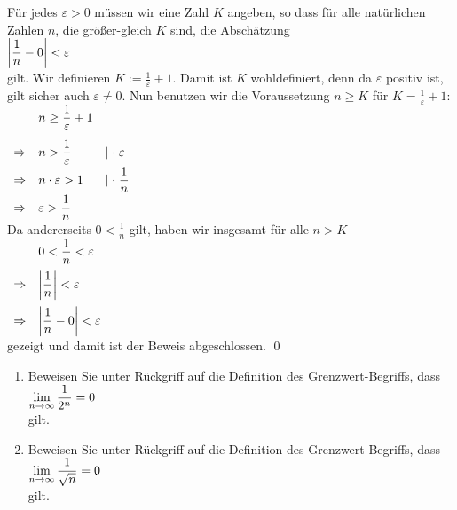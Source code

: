 \proof
F\"ur jedes  $\varepsilon > 0$ m\"ussen wir eine Zahl $K$ angeben, so
dass f\"ur alle nat\"urlichen Zahlen $n$, die gr\"o\ss{}er-gleich $K$ sind, die Absch\"atzung
\\[0.2cm]
\hspace*{1.3cm}
$\displaystyle \left| \frac{1}{n} - 0 \right| < \varepsilon $
\\[0.2cm]
gilt.  Wir definieren $K := \frac{1}{\varepsilon} + 1$.  Damit ist $K$ wohldefiniert,
denn da $\varepsilon$ positiv ist, gilt sicher auch $\varepsilon \not= 0$.  Nun benutzen
wir die Voraussetzung $n \geq K$ f\"ur $K = \frac{1}{\varepsilon} + 1$:
\\[0.2cm]
\hspace*{1.3cm}
$
\begin{array}{cll}
            & \displaystyle n \geq \frac{1}{\varepsilon} + 1      \\[0.4cm] 
\Rightarrow & \displaystyle n > \frac{1}{\varepsilon} & \mid \cdot \;\varepsilon \\[0.2cm]
\Rightarrow & n \cdot \varepsilon > 1        & \displaystyle\mid \cdot \;\frac{1}{n} \\[0.2cm]
\Rightarrow & \displaystyle \varepsilon > \frac{1}{n} & 
\end{array}
$
\\[0.2cm]
Da andererseits  $0 < \frac{1}{n}$ gilt, haben wir insgesamt f\"ur alle $n > K$
\\[0.2cm]
\hspace*{1.3cm}
$
\begin{array}{cl}
            & \displaystyle 0 < \frac{1}{n} < \varepsilon              \\[0.3cm]
\Rightarrow & \displaystyle \left|\frac{1}{n}\right| < \varepsilon     \\[0.4cm]
\Rightarrow & \displaystyle \left|\frac{1}{n}-0\right| < \varepsilon
\end{array}
$
\\[0.2cm]
gezeigt und damit ist der Beweis abgeschlossen. \qed

\exercise
\renewcommand{\labelenumi}{(\alph{enumi})}
\begin{enumerate}
\item Beweisen Sie unter R\"uckgriff auf die Definition des Grenzwert-Begriffs, dass
\\[0.2cm]
\hspace*{1.3cm}
$\displaystyle\lim\limits_{n\rightarrow\infty} \frac{1}{2^n} = 0$ 
\\[0.2cm] gilt.
\item Beweisen Sie unter R\"uckgriff auf die Definition des Grenzwert-Begriffs, dass
\\[0.2cm]
\hspace*{1.3cm}
$\displaystyle\lim\limits_{n\rightarrow\infty} \frac{1}{\sqrt{n}} = 0$ 
\\[0.2cm] 
gilt.  \eox
\end{enumerate} 
\renewcommand{\labelenumi}{\arabic{enumi}.}


